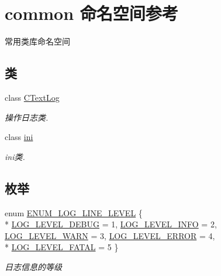 \hypertarget{namespacecommon}{\section{common 命名空间参考}
\label{namespacecommon}
}


常用类库命名空间  


\subsection*{类}
\begin{DoxyCompactItemize}
\item 
class \hyperlink{classcommon_1_1_c_text_log}{C\+Text\+Log}
\begin{DoxyCompactList}\small\item\em 操作日志类. \end{DoxyCompactList}\item 
class \hyperlink{classcommon_1_1ini}{ini}
\begin{DoxyCompactList}\small\item\em ini类. \end{DoxyCompactList}\end{DoxyCompactItemize}
\subsection*{枚举}
\begin{DoxyCompactItemize}
\item 
enum \hyperlink{namespacecommon_af715c011984b434cbb7f04b0d4e57589}{E\+N\+U\+M\+\_\+\+L\+O\+G\+\_\+\+L\+I\+N\+E\+\_\+\+L\+E\+V\+E\+L} \{ \\*
\hyperlink{namespacecommon_af715c011984b434cbb7f04b0d4e57589ab7ce17935d51ac5ff7d948bf7c639998}{L\+O\+G\+\_\+\+L\+E\+V\+E\+L\+\_\+\+D\+E\+B\+U\+G} = 1, 
\hyperlink{namespacecommon_af715c011984b434cbb7f04b0d4e57589aba07f87f81074202ff59db8661e3d44f}{L\+O\+G\+\_\+\+L\+E\+V\+E\+L\+\_\+\+I\+N\+F\+O} = 2, 
\hyperlink{namespacecommon_af715c011984b434cbb7f04b0d4e57589a24bcbd256da906340f42c99ea36d77eb}{L\+O\+G\+\_\+\+L\+E\+V\+E\+L\+\_\+\+W\+A\+R\+N} = 3, 
\hyperlink{namespacecommon_af715c011984b434cbb7f04b0d4e57589ad82d0ab8af0d3318125bb95d5aa55c2c}{L\+O\+G\+\_\+\+L\+E\+V\+E\+L\+\_\+\+E\+R\+R\+O\+R} = 4, 
\\*
\hyperlink{namespacecommon_af715c011984b434cbb7f04b0d4e57589a65a1bea5cce5921300fe87e0ae6956d2}{L\+O\+G\+\_\+\+L\+E\+V\+E\+L\+\_\+\+F\+A\+T\+A\+L} = 5
 \}
\begin{DoxyCompactList}\small\item\em 日志信息的等级 \end{DoxyCompactList}\end{DoxyCompactItemize}
